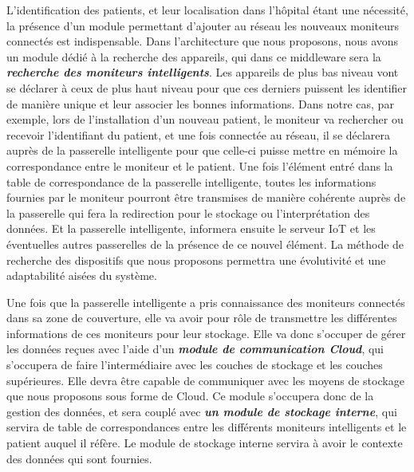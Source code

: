 L’identification des patients, et leur localisation dans l’hôpital étant une nécessité, la présence d’un module permettant d’ajouter au réseau les nouveaux moniteurs connectés est indispensable. Dans l’architecture que nous proposons, nous avons un module dédié à la recherche des appareils, qui dans ce middleware sera la \textbf{\textit{recherche des moniteurs intelligents}}. Les appareils de plus bas niveau vont se déclarer à ceux de plus haut niveau pour que ces derniers puissent les identifier de manière unique et leur associer les bonnes informations. Dans notre cas, par exemple, lors de l’installation d’un nouveau patient, le moniteur va rechercher ou recevoir l’identifiant du patient, et une fois connectée au réseau, il se déclarera auprès de la passerelle intelligente pour que celle-ci puisse mettre en mémoire la correspondance entre le moniteur et le patient. Une fois l’élément entré dans la table de correspondance de la passerelle intelligente, toutes les informations fournies par le moniteur pourront être transmises de manière cohérente auprès de la passerelle qui fera la redirection pour le stockage ou l’interprétation des données. Et la passerelle intelligente, informera ensuite le serveur IoT et les éventuelles autres passerelles de la présence de ce nouvel élément. La méthode de recherche des dispositifs que nous proposons permettra une évolutivité et une adaptabilité aisées du système.\cite{li2015iot}

Une fois que la passerelle intelligente a pris connaissance des moniteurs connectés dans sa zone de couverture, elle va avoir pour rôle de transmettre les différentes informations de ces moniteurs pour leur stockage. Elle va donc s’occuper de gérer les données reçues avec l’aide d’un \textbf{\textit{module de communication Cloud}}, qui s’occupera de faire l’intermédiaire avec les couches de stockage et les couches supérieures. Elle devra être capable de communiquer avec les moyens de stockage que nous proposons sous forme de Cloud. Ce module s’occupera donc de la gestion des données, et sera couplé avec \textbf{\textit{un module de stockage interne}}, qui servira de table de correspondances entre les différents moniteurs intelligents et le patient auquel il réfère. Le module de stockage interne servira à avoir le contexte des données qui sont fournies.

